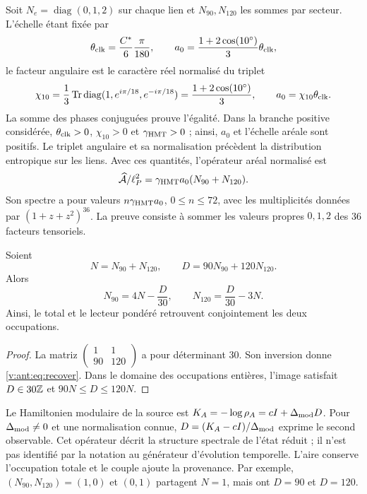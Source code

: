 Soit $N_e=\operatorname{diag}(0,1,2)$ sur chaque lien et
$N_{90},N_{120}$ les sommes par secteur. L'échelle étant fixée par
\[
\theta_{\rm clk}=\frac{C^*}{6}\frac{\pi}{180},\qquad
a_0=\frac{1+2\cos(10^\circ)}3\theta_{\rm clk},
\]
le facteur angulaire est le caractère réel normalisé du triplet
\begin{equation}
 \chi_{10}=\frac13\operatorname{Tr}\operatorname{diag}
       (1,e^{i\pi/18},e^{-i\pi/18})
 =\frac{1+2\cos(10^\circ)}3,
 \qquad a_0=\chi_{10}\theta_{\rm clk}.
 \label{v:ant:eq:ii-area-caracter-triplete}
\end{equation}
La somme des phases conjuguées prouve l'égalité. Dans la branche positive
considérée, \(\theta_{\rm clk}>0\), \(\chi_{10}>0\) et
\(\gamma_{\mathrm{HMT}}>0\) ; ainsi, \(a_0\) et l'échelle aréale sont
positifs. Le triplet angulaire et sa normalisation précèdent la
distribution entropique sur les liens. Avec ces quantités,
l'opérateur aréal normalisé est
\[
\widehat{\mathcal A}/\ell_P^2
=\gamma_{\mathrm{HMT}}a_0(N_{90}+N_{120}).
\]
Son spectre a pour valeurs $n\gamma_{\mathrm{HMT}}a_0$, $0\le n\le72$,
avec les multiplicités données par $(1+z+z^2)^{36}$.
La preuve consiste à sommer les valeurs propres $0,1,2$ des
36 facteurs tensoriels.

\begin{theorem}
Soient
\[
N=N_{90}+N_{120},\qquad D=90N_{90}+120N_{120}.
\]
Alors
\begin{equation}
N_{90}=4N-\frac D{30},\qquad
N_{120}=\frac D{30}-3N.
\label{v:ant:eq:recover}
\end{equation}
Ainsi, le total et le lecteur pondéré retrouvent conjointement
les deux occupations.
\end{theorem}
\begin{proof}
La matriz $\left(\begin{smallmatrix}1&1\\90&120\end{smallmatrix}\right)$
a pour déterminant $30$. Son inversion donne \eqref{v:ant:eq:recover}.
Dans le domaine des occupations entières, l'image satisfait
$D\in30\mathbb Z$ et $90N\le D\le120N$.
\end{proof}

Le Hamiltonien modulaire de la source est
$K_A=-\log\rho_A=cI+\Delta_{\rm mod}D$.
Pour $\Delta_{\rm mod}\ne0$ et une normalisation connue,
$D=(K_A-cI)/\Delta_{\rm mod}$ exprime le second observable.
Cet opérateur décrit la structure spectrale de l’état réduit ;
il n’est pas identifié par la notation au générateur d’évolution temporelle.
L’aire conserve l’occupation totale et le couple ajoute la provenance.
Par exemple, $(N_{90},N_{120})=(1,0)$ et $(0,1)$ partagent $N=1$,
mais ont $D=90$ et $D=120$.

